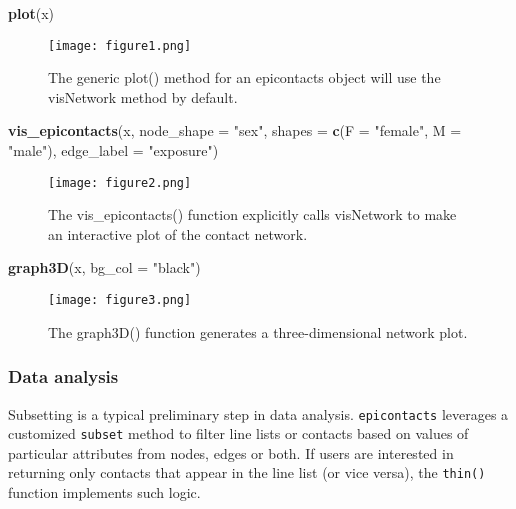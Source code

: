 \documentclass[9pt,a4paper,]{extarticle}
\newenvironment{Shaded}{\begin{snugshade}}{\end{snugshade}}
\newcommand{\KeywordTok}[1]{\textcolor[rgb]{0.13,0.29,0.53}{\textbf{#1}}}
\newcommand{\DataTypeTok}[1]{\textcolor[rgb]{0.13,0.29,0.53}{#1}}
\newcommand{\StringTok}[1]{\textcolor[rgb]{0.31,0.60,0.02}{#1}}
\newcommand{\NormalTok}[1]{#1}
\theoremstyle{definition}
\theoremstyle{definition}
\theoremstyle{definition}
\theoremstyle{remark}
\begin{document}
\begin{Shaded}
\begin{Highlighting}[]
\KeywordTok{plot}\NormalTok{(x)}
\end{Highlighting}
\end{Shaded}

\begin{figure}
\centering
\texttt{[image: figure1.png]}
\caption{The generic plot() method for an epicontacts object will use the visNetwork method by default.}
\end{figure}

\begin{Shaded}
\begin{Highlighting}[]
\KeywordTok{vis_epicontacts}\NormalTok{(x,}
                \DataTypeTok{node_shape =} \StringTok{"sex"}\NormalTok{,}
                \DataTypeTok{shapes =} \KeywordTok{c}\NormalTok{(}\DataTypeTok{F =} \StringTok{"female"}\NormalTok{, }\DataTypeTok{M =} \StringTok{"male"}\NormalTok{),}
                \DataTypeTok{edge_label =} \StringTok{"exposure"}\NormalTok{)}
\end{Highlighting}
\end{Shaded}

\begin{figure}
\centering
\texttt{[image: figure2.png]}
\caption{The vis\_epicontacts() function explicitly calls visNetwork to make an interactive plot of the contact network.}
\end{figure}

\begin{Shaded}
\begin{Highlighting}[]
\KeywordTok{graph3D}\NormalTok{(x, }\DataTypeTok{bg_col =} \StringTok{"black"}\NormalTok{)}
\end{Highlighting}
\end{Shaded}

\begin{figure}
\centering
\texttt{[image: figure3.png]}
\caption{The graph3D() function generates a three-dimensional network plot.}
\end{figure}

\subsubsection{Data analysis}\label{data-analysis}

Subsetting is a typical preliminary step in data analysis. \texttt{epicontacts} leverages a customized \texttt{subset} method to filter line lists or contacts based on values of particular attributes from nodes, edges or both. If users are interested in returning only contacts that appear in the line list (or vice versa), the \texttt{thin()} function implements such logic.
\end{document}
